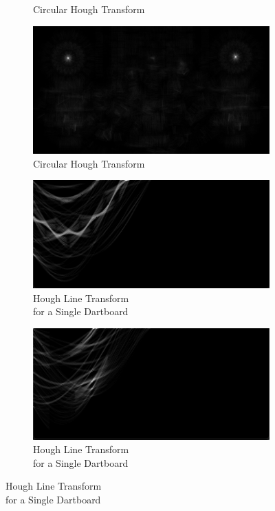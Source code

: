 \documentclass[conference]{IEEEtran}
\begin{document}
\begin{figure}[htb]
\begin{subfigure}{.5\linewidth}
  \caption*{Circular Hough Transform}
  \label{fig:sub1}
\end{subfigure}%
\begin{subfigure}{.5\linewidth}
\vspace{1.1cm}
  \centering
  \includegraphics[width=.9\linewidth]{images/task3/worstcirclehough.png}
  \caption*{Circular Hough Transform}
  \label{fig:sub2}
\end{subfigure}

\begin{subfigure}{.5\linewidth}
\vspace{0.3cm}
  \centering
  \captionsetup{justification=centering}
  \includegraphics[width=.9\linewidth]{images/task3/houghlinebest.png}
  \caption*{Hough Line Transform \\for a Single Dartboard}
  \label{fig:sub1}
\end{subfigure}%
\begin{subfigure}{.5\linewidth}
\captionsetup{justification=centering}
\vspace{0.3cm}
  \centering
  \includegraphics[width=.9\linewidth]{images/task3/houghlineworst.png}
  \caption*{Hough Line Transform \\for a Single Dartboard}
  \label{fig:sub2}
\end{subfigure}




\end{figure}
\end{document}
